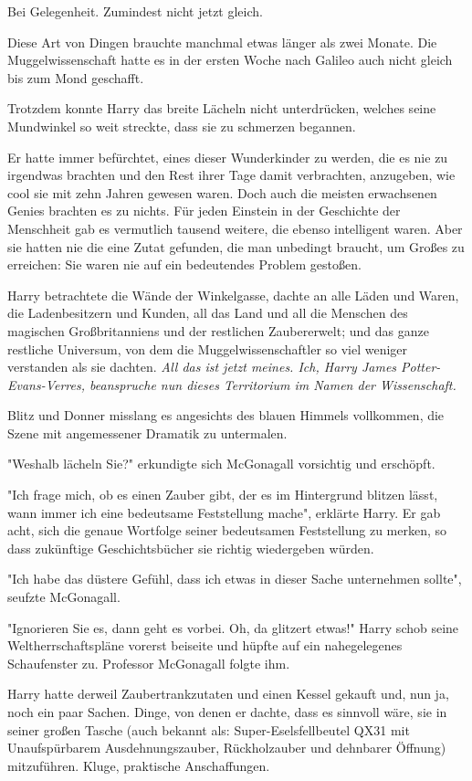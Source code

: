 {Bei Gelegenheit. Zumindest nicht jetzt gleich.

Diese Art von Dingen brauchte manchmal etwas länger als zwei Monate. Die Muggelwissenschaft hatte es in der ersten Woche nach Galileo auch nicht gleich bis zum Mond geschafft.

Trotzdem konnte Harry das breite Lächeln nicht unterdrücken, welches seine Mundwinkel so weit streckte, dass sie zu schmerzen begannen.

Er hatte immer befürchtet, eines dieser Wunderkinder zu werden, die es nie zu irgendwas brachten und den Rest ihrer Tage damit verbrachten, anzugeben, wie cool sie mit zehn Jahren gewesen waren. Doch auch die meisten erwachsenen Genies brachten es zu nichts. Für jeden Einstein in der Geschichte der Menschheit gab es vermutlich tausend weitere, die ebenso intelligent waren. Aber sie hatten nie die eine Zutat gefunden, die man unbedingt braucht, um Großes zu erreichen: Sie waren nie auf ein bedeutendes Problem gestoßen.

Harry betrachtete die Wände der Winkelgasse, dachte an alle Läden und Waren, die Ladenbesitzern und Kunden, all das Land und all die Menschen des magischen Großbritanniens und der restlichen Zaubererwelt; und das ganze restliche Universum, von dem die Muggelwissenschaftler so viel weniger verstanden als sie dachten. \emph{All das ist jetzt meines. Ich, Harry James Potter-Evans-Verres, beanspruche nun dieses Territorium im Namen der Wissenschaft.}

Blitz und Donner misslang es angesichts des blauen Himmels vollkommen, die Szene mit angemessener Dramatik zu untermalen.

"Weshalb lächeln Sie?" erkundigte sich McGonagall vorsichtig und erschöpft.

"Ich frage mich, ob es einen Zauber gibt, der es im Hintergrund blitzen lässt, wann immer ich eine bedeutsame Feststellung mache", erklärte Harry. Er gab acht, sich die genaue Wortfolge seiner bedeutsamen Feststellung zu merken, so dass zukünftige Geschichtsbücher sie richtig wiedergeben würden.

"Ich habe das düstere Gefühl, dass ich etwas in dieser Sache unternehmen sollte", seufzte McGonagall.

"Ignorieren Sie es, dann geht es vorbei. Oh, da glitzert etwas!" Harry schob seine Weltherrschaftspläne vorerst beiseite und hüpfte auf ein nahegelegenes Schaufenster zu. Professor McGonagall folgte ihm.

\later

Harry hatte derweil Zaubertrankzutaten und einen Kessel gekauft und, nun ja, noch ein paar Sachen. Dinge, von denen er dachte, dass es sinnvoll wäre, sie in seiner großen Tasche (auch bekannt als: Super-Eselsfellbeutel QX31 mit Unaufspürbarem Ausdehnungszauber, Rückholzauber und dehnbarer Öffnung) mitzuführen. Kluge, praktische Anschaffungen.

}
